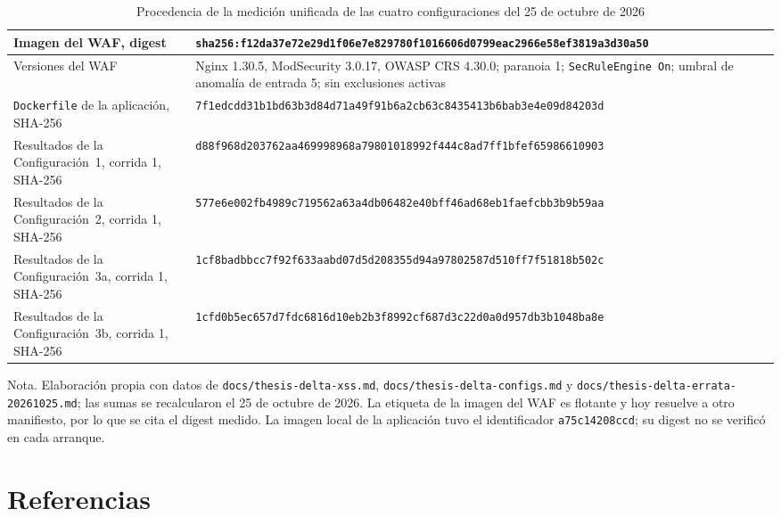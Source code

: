 \begin{table}[H]
\begin{tabular}{|L{4.2cm}|L{9.3cm}|}
Imagen del WAF, digest & {\scriptsize\texttt{sha256:\allowbreak f12da37e72e29d1f06e7e829780f1016606d0799eac2966e58ef3819a3d30a50}} \\ \hline
Versiones del WAF & Nginx 1.30.5, ModSecurity 3.0.17, OWASP CRS 4.30.0; paranoia 1; \texttt{SecRuleEngine On}; umbral de anomalía de entrada 5; sin exclusiones activas \\ \hline
\texttt{Dockerfile} de la aplicación, SHA-256 & {\scriptsize\texttt{7f1edcdd31b1bd63b3d84d71a49f91b6a2cb63c8435413b6bab3e4e09d84203d}} \\ \hline
Resultados de la Configuración~1, corrida 1, SHA-256 & {\scriptsize\texttt{d88f968d203762aa469998968a79801018992f444c8ad7ff1bfef65986610903}} \\ \hline
Resultados de la Configuración~2, corrida 1, SHA-256 & {\scriptsize\texttt{577e6e002fb4989c719562a63a4db06482e40bff46ad68eb1faefcbb3b9b59aa}} \\ \hline
Resultados de la Configuración~3a, corrida 1, SHA-256 & {\scriptsize\texttt{1cf8badbbcc7f92f633aabd07d5d208355d94a97802587d510ff7f51818b502c}} \\ \hline
Resultados de la Configuración~3b, corrida 1, SHA-256 & {\scriptsize\texttt{1cfd0b5ec657d7fdc6816d10eb2b3f8992cf687d3c22d0a0d957db3b1048ba8e}} \\ \hline
\end{tabular}
\caption[Procedencia de la medición unificada]{Procedencia de la medición unificada de las cuatro configuraciones del 25 de octubre de 2026}
\label{tab:anx-ronda5-procedencia}
\end{table}
{\footnotesize Nota. Elaboración propia con datos de \texttt{docs/thesis-delta-xss.md},
\texttt{docs/thesis-delta-configs.md} y \texttt{docs/thesis-delta-errata-20261025.md}; las sumas
se recalcularon el 25 de octubre de 2026. La etiqueta de la imagen del WAF es flotante y hoy
resuelve a otro manifiesto, por lo que se cita el digest medido. La imagen local de la aplicación
tuvo el identificador \texttt{a75c14208ccd}; su digest no se verificó en cada arranque.}

\ifdefined\modoensamble
\else
	\section*{Referencias}
	\printbibliography[heading=none]
	
\fi
